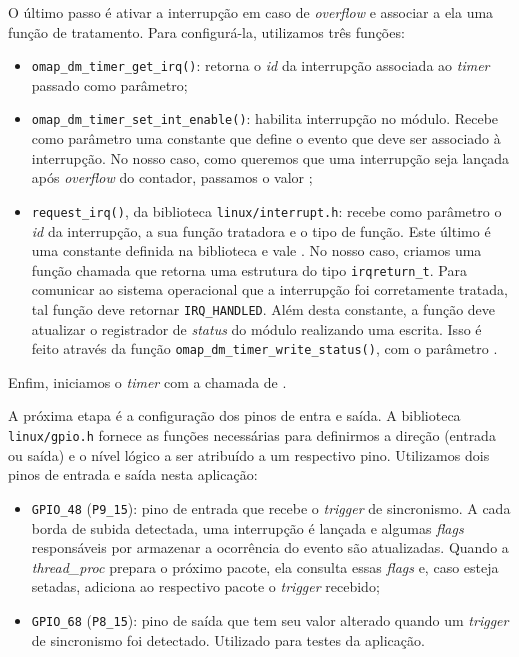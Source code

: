 O último passo é ativar a interrupção em caso de \textit{overflow} e associar a
ela uma função de tratamento. Para configurá-la, utilizamos três funções:

\begin{itemize} \renewcommand\labelitemi{--}
  \item \texttt{omap\_dm\_timer\_get\_irq()}: retorna o \textit{id} da
  interrupção associada ao \textit{timer} passado como parâmetro;

  \item \texttt{omap\_dm\_timer\_set\_int\_enable()}: habilita interrupção no
  módulo. Recebe como parâmetro uma constante que define o evento que deve ser
  associado à interrupção. No nosso caso, como queremos que uma interrupção seja
  lançada após \textit{overflow} do contador, passamos o valor
  ;

  \item \texttt{request\_irq()}, da biblioteca \texttt{linux/interrupt.h}:
  recebe como parâmetro o \textit{id} da interrupção, a sua função tratadora e
  o tipo de função. Este último é uma constante definida na biblioteca e vale
  . No nosso caso, criamos uma função chamada
   que retorna uma estrutura do tipo \texttt{irqreturn\_t}. Para comunicar ao sistema
  operacional que a interrupção foi corretamente tratada, tal função deve
  retornar \texttt{IRQ\_HANDLED}. Além desta constante, a função deve atualizar
  o registrador de \textit{status} do módulo realizando uma escrita. Isso é
  feito através da função \texttt{omap\_dm\_timer\_write\_status()}, com o
  parâmetro .
\end{itemize}
 
Enfim, iniciamos o \textit{timer} com a chamada de .

\vspace{12pt}

A próxima etapa é a configuração dos pinos de entra e saída. A biblioteca
\texttt{linux/gpio.h} fornece as funções necessárias para definirmos a direção
(entrada ou saída) e o nível lógico a ser atribuído a um respectivo pino.
Utilizamos dois pinos de entrada e saída nesta aplicação:

\begin{itemize} \renewcommand\labelitemi{--}
  \item \texttt{GPIO\_48} (\texttt{P9\_15}): pino de entrada que recebe o
  \textit{trigger} de sincronismo. A cada borda de subida detectada, uma
  interrupção é lançada e algumas \textit{flags} responsáveis por armazenar a
  ocorrência do evento são atualizadas. Quando a \textit{thread\_proc} prepara o
  próximo pacote, ela consulta essas \textit{flags} e, caso esteja setadas,
  adiciona ao respectivo pacote o \textit{trigger} recebido;

  \item \texttt{GPIO\_68} (\texttt{P8\_15}): pino de saída que tem seu valor
  alterado quando um \textit{trigger} de sincronismo foi detectado. Utilizado
  para testes da aplicação.
\end{itemize}


